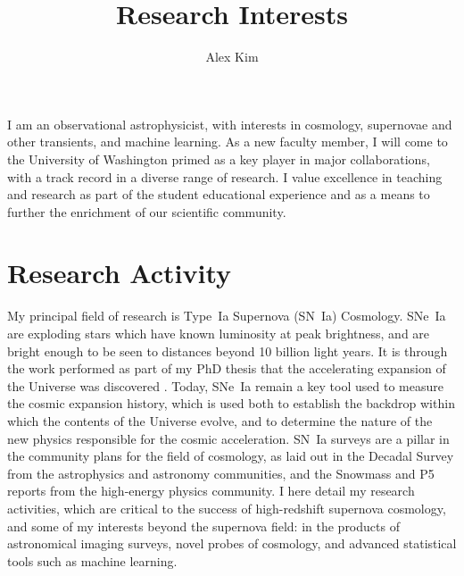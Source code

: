 \documentclass[12pt]{article}
\date{}
\newcommand{\where}{the University of Washington}
\newcommand{\where}{the University of Michigan}
\begin{document}
\title{Research Interests}
\author{Alex Kim}
\maketitle

I am an observational astrophysicist, with interests in
cosmology, supernovae and other transients, and machine learning.
As a new faculty member, I will come to \where{}
primed as a key player in major collaborations, with a
track record in a diverse range of research.  I  value excellence
in teaching and research as part of the student educational experience
and as a means to  further the enrichment of our scientific community.

\section{Research Activity}
My principal field of research is  Type~Ia Supernova (SN~Ia) Cosmology. 
SNe~Ia are exploding stars which have known luminosity at peak brightness, and are  bright enough to be
seen to distances beyond 10 billion light years.  It is through the work
performed as part of my PhD thesis that the accelerating
expansion of the Universe was discovered \cite{1997ApJ...483..565P}.  Today, SNe~Ia remain a key tool used
to measure the cosmic expansion history, which is used both to establish
the  backdrop within which the contents of the Universe evolve,
and to determine the nature of the new physics responsible
for the cosmic acceleration.
SN~Ia surveys are a pillar  in the community plans for the field of cosmology,
as laid out in
the Decadal Survey from the astrophysics and astronomy communities, and the Snowmass
\cite{2013arXiv1309.5386D,2013arXiv1309.5382K} and P5 reports
from the high-energy physics community.  I here detail my research activities,
which are critical to the success of high-redshift supernova cosmology,
and some of my interests beyond the supernova field: in the products of astronomical imaging surveys,
novel probes of cosmology, and advanced statistical tools such as machine learning.
\end{document}
